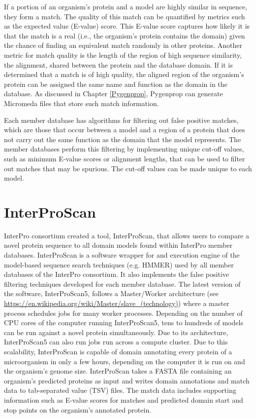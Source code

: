 If a portion of an organism's protein and a model are highly similar in sequence, they form a match. The quality of this match can be quantified by metrics such as the expected value (E-value) score. This E-value score captures how likely it is that the match is a real (i.e., the organism's protein contains the domain) given the chance of finding an equivalent match randomly in other proteins. Another metric for match quality is the length of the region of high sequence similarity, the alignment, shared between the protein and the database domain. If it is determined that a match is of high quality, the aligned region of the organism's protein can be assigned the same name and function as the domain in the database.  As discussed in Chapter \ref{Pygenprop}, Pygenprop can generate Micromeda files that store such match information.

Each member database has algorithms for filtering out false positive matches, which are those that occur between a model and a region of a protein that does not carry out the same function as the domain that the model represents. The member databases perform this filtering by implementing unique cut-off values, such as minimum E-value scores or alignment lengths, that can be used to filter out matches that may be spurious. The cut-off values can be made unique to each model. 

\section{InterProScan} \label{overview-interproscan}

InterPro consortium created a tool, InterProScan, that allows users to compare a novel protein sequence to all domain models found within InterPro member databases. InterProScan is a software wrapper for and execution engine of the model-based sequence search techniques (e.g. HMMER) used by all member databases of the InterPro consortium. It also implements the false positive filtering techniques developed for each member database. The latest version of the software, InterProScan5, follows a Master/Worker architecture (see \href{https://en.wikipedia.org/wiki/Master/slave\_(technology)}{https://en.wikipedia.org/wiki/Master/slave\_(technology)}) where a master process schedules jobs for many worker processes. Depending on the number of CPU cores of the computer running InterProScan5, tens to hundreds of models can be run against a novel protein simultaneously. Due to its architecture, InterProScan5 can also run jobs run across a compute cluster. Due to this scalability, InterProScan is capable of domain annotating every protein of a microorganism in only a few hours, depending on the computer it is run on and the organism's genome size. InterProScan takes a FASTA file \cite{pearson19905} containing an organism's predicted proteins as input and writes domain annotations and match data to tab-separated value (TSV) files. The match data includes supporting information such as E-value scores for matches and predicted domain start and stop points on the organism's annotated protein.

